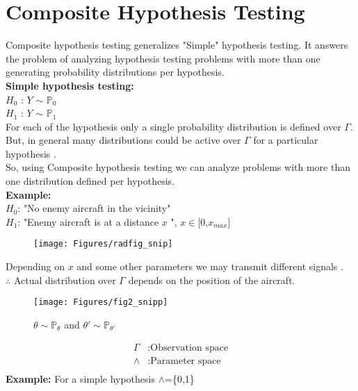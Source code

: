 \documentclass[12pt]{report}
\begin{document}
\section{Composite Hypothesis Testing}
Composite hypothesis testing generalizes "Simple" hypothesis testing. It answers the problem of analyzing hypothesis testing problems with more than one generating probability distributions per hypothesis.\\[50pt]
{\bf Simple hypothesis testing:} \\
$H_0$ : $Y$  $\sim$ $\mathbb{P}_0$\\
$H_1$ : $Y$  $\sim$ $\mathbb{P}_1$ \\
For each of the hypothesis only a single probability distribution is defined over $\Gamma$.\\
But, in general many distributions could be active over $\Gamma$ for a particular hypothesis .\\
So, using Composite hypothesis testing we can analyze problems with more than one distribution defined per hypothesis.\\[10pt]
\textbf{Example:}\\
$H_0$: "No enemy aircraft in the vicinity"\\
$H_1$: "Enemy aircraft is at a distance $x$ ", $x$$\in$[0,$x_{max}$]\\
\begin{figure}[h]
\centering
\texttt{[image: Figures/radfig\_snip]}
\end{figure}
Depending on $x$ and some other parameters we may transmit different signals . \\
$\therefore$ Actual distribution over $\Gamma$ depends on the position of the aircraft.\\
\begin{figure}[h]
\centering
\texttt{[image: Figures/fig2\_snipp]}
\caption{$\theta\sim\mathbb{P}_{\theta}$ and $\theta'\sim\mathbb{P}_{\theta'}$ }
\end{figure}
\begin{align*}
\Gamma&: \text{Observation space}\\
\wedge&: \text{Parameter space}\\[-10pt]
\end{align*}
\textbf{Example:} For a simple hypothesis $\wedge$=\{0,1\}\\[-15pt]
\end{document}
